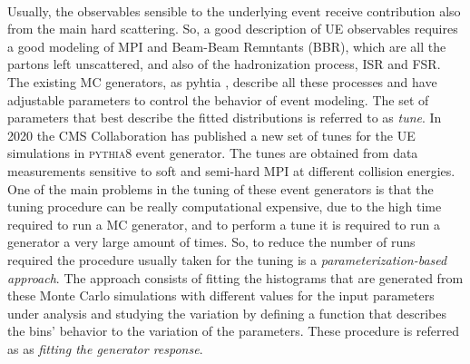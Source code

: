 \\
Usually, the observables sensible to the underlying event receive contribution also from the main hard scattering. So, a good  description of UE observables requires a good modeling of MPI and Beam-Beam Remntants (BBR), which are all the partons left unscattered, and also of the hadronization process, ISR and FSR. The existing MC generators, as pyhtia \cite{PYTHIA2015}, describe all these processes and have adjustable parameters to control the behavior of event modeling. The set of parameters that best describe the fitted distributions is referred to as \textit{tune}. 
In 2020 the CMS Collaboration has published a new set of tunes for the UE simulations \cite{CPtunes} in \textsc{pythia8} event generator. The tunes are obtained from data measurements sensitive to soft and semi-hard MPI at different collision energies. 
\\
One of the main problems in the tuning of these event generators is that the tuning procedure can be really computational expensive, due to the high time required to run a MC generator, and to perform a tune it is required to run a generator a very large amount of times. So, to reduce the number of runs required the procedure usually taken for the tuning is a \textit{parameterization-based approach}. The approach consists of fitting the histograms that are generated from these Monte Carlo simulations with different values for the input parameters under analysis and studying the variation by  defining a function that describes the bins' behavior to the variation of the parameters. These procedure is referred as as \textit{fitting the generator response}.

\medskip

